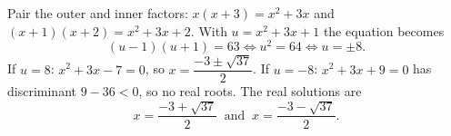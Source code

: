 Pair the outer and inner factors: $x(x+3)=x^2+3x$ and $(x+1)(x+2)=x^2+3x+2$. With $u=x^2+3x+1$ the equation becomes
\[
(u-1)(u+1)=63\iff u^2=64\iff u=\pm8 .
\]
If $u=8$: $x^2+3x-7=0$, so $x=\dfrac{-3\pm\sqrt{37}}{2}$. If $u=-8$: $x^2+3x+9=0$ has discriminant $9-36<0$, so no real roots. The real solutions are
\[
\boxed{x=\dfrac{-3+\sqrt{37}}{2}\ \text{ and }\ x=\dfrac{-3-\sqrt{37}}{2}}.
\]
